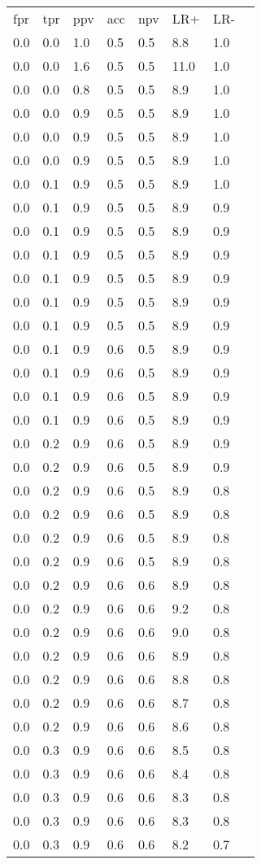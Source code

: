 \begin{tabular}{L{1in}|L{1in}|L{1in}|L{1in}|L{1in}|L{1in}|L{1in}|L{1in}}\hline
fpr&tpr&ppv&acc&npv&LR+&LR-\\
0.0&0.0&1.0&0.5&0.5&8.8&1.0\\
0.0&0.0&1.6&0.5&0.5&11.0&1.0\\
0.0&0.0&0.8&0.5&0.5&8.9&1.0\\
0.0&0.0&0.9&0.5&0.5&8.9&1.0\\
0.0&0.0&0.9&0.5&0.5&8.9&1.0\\
0.0&0.0&0.9&0.5&0.5&8.9&1.0\\
0.0&0.1&0.9&0.5&0.5&8.9&1.0\\
0.0&0.1&0.9&0.5&0.5&8.9&0.9\\
0.0&0.1&0.9&0.5&0.5&8.9&0.9\\
0.0&0.1&0.9&0.5&0.5&8.9&0.9\\
0.0&0.1&0.9&0.5&0.5&8.9&0.9\\
0.0&0.1&0.9&0.5&0.5&8.9&0.9\\
0.0&0.1&0.9&0.5&0.5&8.9&0.9\\
0.0&0.1&0.9&0.6&0.5&8.9&0.9\\
0.0&0.1&0.9&0.6&0.5&8.9&0.9\\
0.0&0.1&0.9&0.6&0.5&8.9&0.9\\
0.0&0.1&0.9&0.6&0.5&8.9&0.9\\
0.0&0.2&0.9&0.6&0.5&8.9&0.9\\
0.0&0.2&0.9&0.6&0.5&8.9&0.9\\
0.0&0.2&0.9&0.6&0.5&8.9&0.8\\
0.0&0.2&0.9&0.6&0.5&8.9&0.8\\
0.0&0.2&0.9&0.6&0.5&8.9&0.8\\
0.0&0.2&0.9&0.6&0.5&8.9&0.8\\
0.0&0.2&0.9&0.6&0.6&8.9&0.8\\
0.0&0.2&0.9&0.6&0.6&9.2&0.8\\
0.0&0.2&0.9&0.6&0.6&9.0&0.8\\
0.0&0.2&0.9&0.6&0.6&8.9&0.8\\
0.0&0.2&0.9&0.6&0.6&8.8&0.8\\
0.0&0.2&0.9&0.6&0.6&8.7&0.8\\
0.0&0.2&0.9&0.6&0.6&8.6&0.8\\
0.0&0.3&0.9&0.6&0.6&8.5&0.8\\
0.0&0.3&0.9&0.6&0.6&8.4&0.8\\
0.0&0.3&0.9&0.6&0.6&8.3&0.8\\
0.0&0.3&0.9&0.6&0.6&8.3&0.8\\
0.0&0.3&0.9&0.6&0.6&8.2&0.7\\

\end{tabular}
